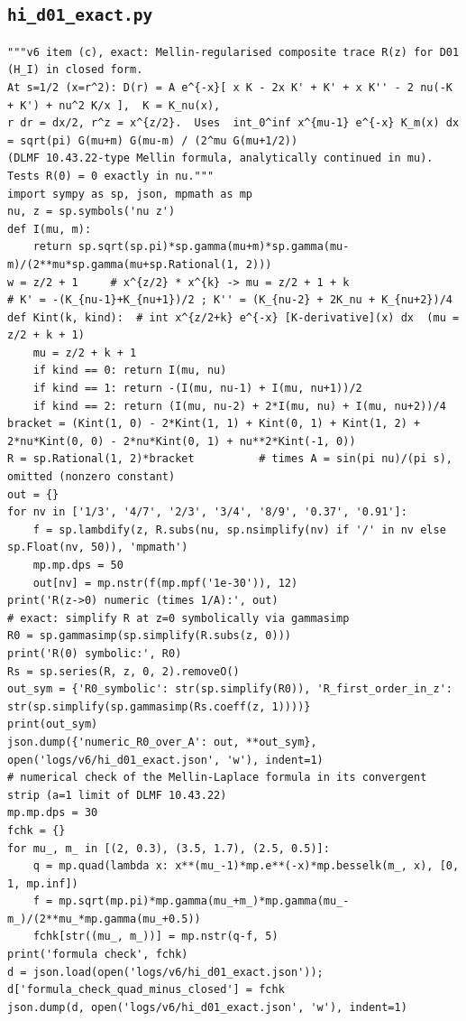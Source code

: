 \documentclass[10pt]{article}
\begin{document}
\subsection{\texttt{hi\_d01\_exact.py}}
\begin{lstlisting}
"""v6 item (c), exact: Mellin-regularised composite trace R(z) for D01 (H_I) in closed form.
At s=1/2 (x=r^2): D(r) = A e^{-x}[ x K - 2x K' + K' + x K'' - 2 nu(-K + K') + nu^2 K/x ],  K = K_nu(x),
r dr = dx/2, r^z = x^{z/2}.  Uses  int_0^inf x^{mu-1} e^{-x} K_m(x) dx = sqrt(pi) G(mu+m) G(mu-m) / (2^mu G(mu+1/2))
(DLMF 10.43.22-type Mellin formula, analytically continued in mu).  Tests R(0) = 0 exactly in nu."""
import sympy as sp, json, mpmath as mp
nu, z = sp.symbols('nu z')
def I(mu, m):
    return sp.sqrt(sp.pi)*sp.gamma(mu+m)*sp.gamma(mu-m)/(2**mu*sp.gamma(mu+sp.Rational(1, 2)))
w = z/2 + 1     # x^{z/2} * x^{k} -> mu = z/2 + 1 + k
# K' = -(K_{nu-1}+K_{nu+1})/2 ; K'' = (K_{nu-2} + 2K_nu + K_{nu+2})/4
def Kint(k, kind):  # int x^{z/2+k} e^{-x} [K-derivative](x) dx  (mu = z/2 + k + 1)
    mu = z/2 + k + 1
    if kind == 0: return I(mu, nu)
    if kind == 1: return -(I(mu, nu-1) + I(mu, nu+1))/2
    if kind == 2: return (I(mu, nu-2) + 2*I(mu, nu) + I(mu, nu+2))/4
bracket = (Kint(1, 0) - 2*Kint(1, 1) + Kint(0, 1) + Kint(1, 2) + 2*nu*Kint(0, 0) - 2*nu*Kint(0, 1) + nu**2*Kint(-1, 0))
R = sp.Rational(1, 2)*bracket          # times A = sin(pi nu)/(pi s), omitted (nonzero constant)
out = {}
for nv in ['1/3', '4/7', '2/3', '3/4', '8/9', '0.37', '0.91']:
    f = sp.lambdify(z, R.subs(nu, sp.nsimplify(nv) if '/' in nv else sp.Float(nv, 50)), 'mpmath')
    mp.mp.dps = 50
    out[nv] = mp.nstr(f(mp.mpf('1e-30')), 12)
print('R(z->0) numeric (times 1/A):', out)
# exact: simplify R at z=0 symbolically via gammasimp
R0 = sp.gammasimp(sp.simplify(R.subs(z, 0)))
print('R(0) symbolic:', R0)
Rs = sp.series(R, z, 0, 2).removeO()
out_sym = {'R0_symbolic': str(sp.simplify(R0)), 'R_first_order_in_z': str(sp.simplify(sp.gammasimp(Rs.coeff(z, 1))))}
print(out_sym)
json.dump({'numeric_R0_over_A': out, **out_sym}, open('logs/v6/hi_d01_exact.json', 'w'), indent=1)
# numerical check of the Mellin-Laplace formula in its convergent strip (a=1 limit of DLMF 10.43.22)
mp.mp.dps = 30
fchk = {}
for mu_, m_ in [(2, 0.3), (3.5, 1.7), (2.5, 0.5)]:
    q = mp.quad(lambda x: x**(mu_-1)*mp.e**(-x)*mp.besselk(m_, x), [0, 1, mp.inf])
    f = mp.sqrt(mp.pi)*mp.gamma(mu_+m_)*mp.gamma(mu_-m_)/(2**mu_*mp.gamma(mu_+0.5))
    fchk[str((mu_, m_))] = mp.nstr(q-f, 5)
print('formula check', fchk)
d = json.load(open('logs/v6/hi_d01_exact.json')); d['formula_check_quad_minus_closed'] = fchk
json.dump(d, open('logs/v6/hi_d01_exact.json', 'w'), indent=1)
\end{lstlisting}
\end{document}
